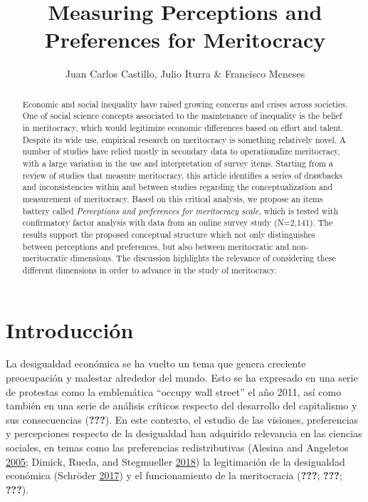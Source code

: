 \documentclass[
]{article}
\title{Measuring Perceptions and Preferences for Meritocracy}
\author{Juan Carlos Castillo, Julio Iturra \& Francisco Meneses}
\date{}
\begin{document}
\maketitle
\begin{abstract}
Economic and social inequality have raised growing concerns and crises across societies. One of social science concepts associated to the maintenance of inequality is the belief in meritocracy, which would legitimize economic differences based on effort and talent. Despite its wide use, empirical research on meritocracy is something relatively novel. A number of studies have relied mostly in secondary data to operationalize meritocracy, with a large variation in the use and interpretation of survey items. Starting from a review of studies that measure meritocracy, this article identifies a series of drawbacks and inconsistencies within and between studies regarding the conceptualization and measurement of meritocracy. Based on this critical analysis, we propose an items battery called \emph{Perceptions and preferences for meritocracy scale}, which is tested with confirmatory factor analysis with data from an online survey study (N=2,141). The results support the proposed conceptual structure which not only distinguishes between perceptions and preferences, but also between meritocratic and non-meritocratic dimensions. The discussion highlights the relevance of considering these different dimensions in order to advance in the study of meritocracy.
\end{abstract}

\hypertarget{part-introducciuxf3n}{%
\part*{Introducción}\label{part-introducciuxf3n}}

La desigualdad económica se ha vuelto un tema que genera creciente preocupación y malestar alrededor del mundo. Esto se ha expresado en una serie de protestas como la emblemática ``occupy wall street'' el año 2011, así como también en una serie de análisis críticos respecto del desarrollo del capitalismo y sus consecuencias ({\textbf{???}}). En este contexto, el estudio de las visiones, preferencias y percepciones respecto de la desigualdad han adquirido relevancia en las ciencias sociales, en temas como las preferencias redistributivas (Alesina and Angeletos \protect\hyperlink{ref-alesina_Fairness_2005}{2005}; Dimick, Rueda, and Stegmueller \protect\hyperlink{ref-dimick_Models_2018}{2018}) la legitimación de la desigualdad económica (Schröder \protect\hyperlink{ref-schroder_Income_2017}{2017}) y el funcionamiento de la meritocracia ({\textbf{???}}; {\textbf{???}}; {\textbf{???}}).
\end{document}
